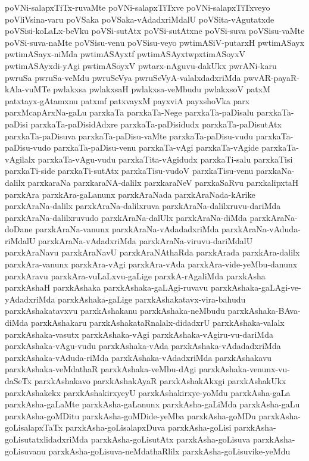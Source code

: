 {poVNi-salapxTiTx-ruvaMte
poVNi-salapxTiTxve
poVNi-salapxTiTxveyo
poVliVsina-varu
poVSaka
poVSaka-vAdadxriMdalU
poVSita-vAgutatxde
poVSisi-koLaLx-beVku
poVSi-sutAtx
poVSi-sutAtxne
poVSi-suva
poVSisu-vaMte
poVSi-suva-naMte
poVSisu-venu
poVSisu-veyo
pwtimASiV-putarxH
pwtimASayx
pwtimASayx-niMda
pwtimASAyxtf
pwtimASAyxtwpxtimASoyxV
pwtimASAyxdi-yAgi
pwtimASoyxV
pwtarx-nAguvu-dakUkx
pwrANi-karu
pwruSa
pwruSa-veMdu
pwruSeVya
pwruSeVyA-valalxdadxriMda
pwvAR-payaR-kAla-vuMTe
pwlakxsa
pwlakxsaH
pwlakxsa-veMbudu
pwlakxsoV
patxM
patxtayx-gAtamxnu
patxmf
patxvayxM
payxviA
payxshoVka
parx
parxMcapArxNa-gaLu
parxkaTa
parxkaTa-Nege
parxkaTa-paDisalu
parxkaTa-paDisi
parxkaTa-paDisidAdxre
parxkaTa-paDisidudx
parxkaTa-paDisutAtx
parxkaTa-paDisuva
parxkaTa-paDisu-vaMte
parxkaTa-paDisu-vudu
parxkaTa-paDisu-vudo
parxkaTa-paDisu-venu
parxkaTa-vAgi
parxkaTa-vAgide
parxkaTa-vAgilalx
parxkaTa-vAgu-vudu
parxkaTita-vAgidudx
parxkaTi-salu
parxkaTisi
parxkaTi-side
parxkaTi-sutAtx
parxkaTisu-vudoV
parxkaTisu-venu
parxkaNa-dalilx
parxkaraNa
parxkaraNA-dalilx
parxkaraNeV
parxkaSaRvu
parxkalipxtaH
parxkAra
parxkAra-gaLanunx
parxkAraNada
parxkAraNada-kArike
parxkAraNa-dalilx
parxkAraNa-dalilxruva
parxkAraNa-dalilxruvu-dariMda
parxkAraNa-dalilxruvudo
parxkAraNa-dalUlx
parxkAraNa-diMda
parxkAraNa-doDane
parxkAraNa-vanunx
parxkAraNa-vAdadadxriMda
parxkAraNa-vAduda-riMdalU
parxkAraNa-vAdadxriMda
parxkAraNa-viruvu-dariMdalU
parxkAraNavu
parxkAraNavU
parxkAraNAthaRda
parxkArada
parxkAra-dalilx
parxkAra-vanunx
parxkAra-vAgi
parxkAra-vAda
parxkAra-vide-yeMbu-danunx
parxkAravu
parxkAra-vuLaLxvu-gaLige
parxkA-rAgaliMda
parxkAsha
parxkAshaH
parxkAshaka
parxkAshaka-gaLAgi-ruvavu
parxkAshaka-gaLAgi-ve-yAdadxriMda
parxkAshaka-gaLige
parxkAshakatavx-vira-bahudu
parxkAshakatavxvu
parxkAshakanu
parxkAshaka-neMbudu
parxkAshaka-BAva-diMda
parxkAshakaru
parxkAshakataRnalalx-didadxrU
parxkAshaka-valalx
parxkAshaka-vasutx
parxkAshaka-vAgi
parxkAshaka-vAgiru-vu-dariMda
parxkAshaka-vAgu-vudu
parxkAshaka-vAda
parxkAshaka-vAdadadxriMda
parxkAshaka-vAduda-riMda
parxkAshaka-vAdadxriMda
parxkAshakavu
parxkAshaka-veMdathaR
parxkAshaka-veMbu-dAgi
parxkAshaka-venunx-vu-daSeTx
parxkAshakavo
parxkAshakAyaR
parxkAshakAkxgi
parxkAshakUkx
parxkAshakekx
parxkAshakirxyeyU
parxkAshakirxye-yoMdu
parxkAsha-gaLa
parxkAsha-gaLaMte
parxkAsha-gaLanunx
parxkAsha-gaLiMda
parxkAsha-gaLu
parxkAsha-goMDitu
parxkAsha-goMDide-yeMba
parxkAsha-goMDu
parxkAsha-goLisalapxTaTx
parxkAsha-goLisalapxDuva
parxkAsha-goLisi
parxkAsha-goLisutatxlidadxriMda
parxkAsha-goLisutAtx
parxkAsha-goLisuva
parxkAsha-goLisuvanu
parxkAsha-goLisuva-neMdathaRlilx
parxkAsha-goLisuvike-yeMdu
}
